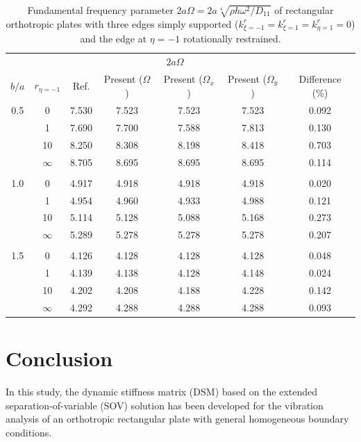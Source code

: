\documentclass[preprint,12pt]{elsarticle}
\begin{document}
\begin{table}[!htbp]  
	\centering
	\caption{Fundamental frequency parameter $2a\Omega = 2a\sqrt[4]{\rho h \omega^2/D_{11}}$ of rectangular orthotropic plates with three edges simply supported ($k^r_{\xi=-1} = k^r_{\xi=1} = k^r_{\eta=1} = 0$) and the edge at $\eta = -1$ rotationally restrained.}
	\begin{tabular}{c c c c c c c }
		\toprule
		\multicolumn{2}{c}{} & \multicolumn{4}{c}{$2a\Omega$} & \\ 
		\cmidrule(lr){3-7}
		$b/a$ & $r_{\eta=-1}$ & Ref.\Citealp{zhang2019new} & Present ($\Omega$) & Present ($\Omega_x$) & Present ($\Omega_y$) & Difference (\%) \\ 
		\midrule
		0.5 & 0         & 7.530 & 7.523 & 7.523 & 7.523 & 0.092 \\ 
		& 1         & 7.690 & 7.700 & 7.588 & 7.813 & 0.130 \\ 
		& 10        & 8.250 & 8.308 & 8.198 & 8.418 & 0.703 \\ 
		& $\infty$  & 8.705 & 8.695 & 8.695 & 8.695 & 0.114 \\ 
		\\
		1.0 & 0         & 4.917 & 4.918 & 4.918 & 4.918 & 0.020 \\ 
		& 1         & 4.954 & 4.960 & 4.933 & 4.988 & 0.121 \\ 
		& 10        & 5.114 & 5.128 & 5.088 & 5.168 & 0.273 \\ 
		& $\infty$  & 5.289 & 5.278 & 5.278 & 5.278 & 0.207 \\ 
		\\
		1.5 & 0         & 4.126 & 4.128 & 4.128 & 4.128 & 0.048 \\ 
		& 1         & 4.139 & 4.138 & 4.128 & 4.148 & 0.024 \\ 
		& 10        & 4.202 & 4.208 & 4.188 & 4.228 & 0.142 \\ 
		& $\infty$  & 4.292 & 4.288 & 4.288 & 4.288 & 0.093 \\ 
		\bottomrule
	\end{tabular}
	\label{tab:oth2}
\end{table}

\FloatBarrier
\section{Conclusion}
In this study, the dynamic stiffness matrix (DSM) based on the extended separation-of-variable (SOV) solution has been developed for the vibration analysis of an orthotropic rectangular plate with general homogeneous boundary conditions. 
\end{document}
